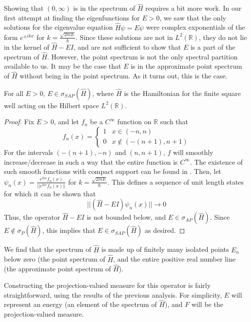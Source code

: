 Showing that $(0,\infty)$ is in the spectrum of $\hat{H}$ requires a bit more
work. In our first attempt at finding the eigenfunctions for $E>0$, we saw that
the only solutions for the eigenvalue equation $\hat{H}\psi = E\psi$ were
complex exponentials of the form $e^{\pm ikx}$ for
$k=\frac{\sqrt{2mE}}{\hbar}$. Since these solutions are not in
$L^2(\mathbb{R})$, they do not lie in the kernel of $\hat{H}-EI$, and are not
sufficient to show that $E$ is a part of the spectrum of $\hat{H}$. However, the
point spectrum is not the only spectral partition available to us. It may be the
case that $E$ is in the approximate point spectrum of $\hat{H}$ without being in
the point spectrum. As it turns out, this is the case.

\begin{theorem}
    For all $E>0$, $E\in\sigma_{SAP}(\hat{H})$, where $\hat{H}$ is the
    Hamiltonian for the finite square well acting on the Hilbert space
    $L^2(\mathbb{R})$.
\end{theorem}

\begin{proof}
    Fix $E>0$, and let $f_n$ be a $C^{\infty}$ function on $\mathbb{R}$ such
    that
    \[
        f_n(x) =
        \begin{cases}
            1 & x\in(-n,n)\\
            0 & x\not\in(-(n+1),n+1)
        \end{cases}
    \]
    For the intervals $(-(n+1),-n)$ and $(n,n+1)$, $f$ will smoothly
    increase/decrease in such a way that the entire function is $C^{\infty}$.
    The existence of such smooth functions with compact support can be found in
    \cite[p.299-300]{Lang1993}.
    Then, let $\psi_n(x) = \frac{e^{ikx}f_n(x)}{||e^{ikx}f_n(x)||}$ for
    $k=\frac{\sqrt{2mE}}{\hbar}$. This defines a sequence of unit length states
    for which it can be shown that
    \[
        ||(\hat{H}-EI)\psi_n(x)||\to 0
        \]
    Thus, the operator $\hat{H}-EI$ is not bounded below, and
    $E\in\sigma_{AP}(\hat{H})$. Since $E\not\in\sigma_P(\hat{H})$, this implies
    that $E\in\sigma_{SAP}(\hat{H})$ as desired.
\end{proof}

We find that the spectrum of $\hat{H}$ is made up of finitely many isolated
points $E_n$ below zero (the point spectrum of $\hat{H}$, and the entire
positive real number line (the approximate point spectrum of $\hat{H}$).

Constructing the projection-valued measure for this operator is fairly
straightforward, using the results of the previous analysis. For simplicity,
$E$ will represent an energy (an element of the spectrum of $\hat{H}$), and $F$
will be the projection-valued measure.

